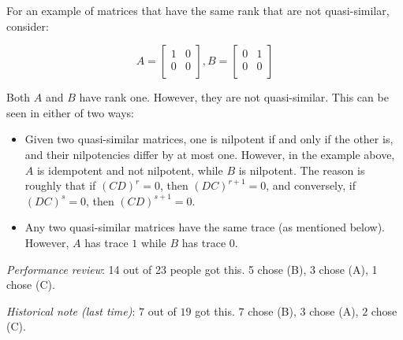 \documentclass[10pt]{amsart}
\begin{document}
\begin{enumerate}
  For an example of matrices that have the same rank that are not quasi-similar, consider:

  $$A = \left[\begin{matrix} 1 & 0 \\ 0 & 0 \\\end{matrix}\right], B = \left[\begin{matrix} 0 & 1 \\ 0 & 0 \\\end{matrix}\right]$$

  Both $A$ and $B$ have rank one. However, they are not
  quasi-similar. This can be seen in either of two ways:

  \begin{itemize}
  \item Given two quasi-similar matrices, one is nilpotent if and only
    if the other is, and their nilpotencies differ by at most
    one. However, in the example above, $A$ is idempotent and not
    nilpotent, while $B$ is nilpotent. The reason is roughly that if
    $(CD)^r = 0$, then $(DC)^{r+1} = 0$, and conversely, if $(DC)^s =
    0$, then $(CD)^{s+1} = 0$.
  \item Any two quasi-similar matrices have the same trace (as
    mentioned below). However, $A$ has trace $1$ while $B$ has trace
    $0$.
  \end{itemize}

  {\em Performance review}: 14 out of 23 people got this. 5 chose (B),
  3 chose (A), 1 chose (C).

  {\em Historical note (last time)}: $7$ out of $19$ got this. $7$ chose (B),
  $3$ chose (A), $2$ chose (C).


\end{enumerate}
\end{document}
